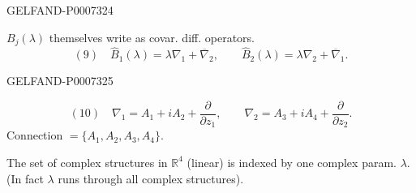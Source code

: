 \begin{GelfandAdjacentEvidence}{GELFAND-P000732}{4}


\(B_j(\lambda)\) themselves write as covar. diff. operators.
\[
(9)\quad \widehat B_1(\lambda)=\lambda\nabla_1+\overline{\nabla}_2,\qquad
\widehat B_2(\lambda)=\lambda\nabla_2+\overline{\nabla}_1.
\]
\end{GelfandAdjacentEvidence}
\begin{GelfandAdjacentEvidence}{GELFAND-P000732}{5}

\[
(10)\quad
\nabla_1=A_1+iA_2+\frac{\partial}{\partial z_1},\qquad
\nabla_2=A_3+iA_4+\frac{\partial}{\partial z_2}.
\]
Connection \(=\{A_1,A_2,A_3,A_4\}\).

The set of complex structures in \(\mathbb R^4\) (linear) is indexed by one complex param. \(\lambda\).
(In fact \(\lambda\) runs through all complex structures).
\end{GelfandAdjacentEvidence}



